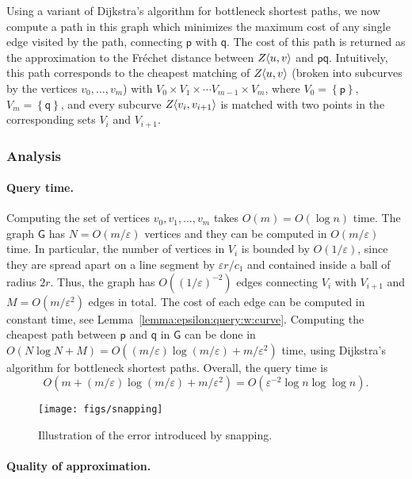 \documentclass[12pt]{article}
\newcommand{\lemref}[1]{Lemma~\ref{lemma:#1}}
\newcommand{\figlab}[1]{\label{fig:#1}}
\newcommand{\ts}{\hspace{0.6pt}}
\newcommand{\Frechet}{Fr\'{e}c{h}e{}t\xspace}\providecommand{\Arr}{\mathop{\mathrm{\EuScript{A}}}}
\newcommand{\pnt}{\mathsf{p}}
\newcommand{\pntA}{\mathsf{q}}
\newcommand{\cZ}{{Z}}
\newcommand{\Graph}{\mathsf{G}}
\providecommand{\pth}[2][\!]{#1\left({#2}\right)}
\providecommand{\brc}[1]{\left\{ {#1} \right\}}
\newcommand{\constA}{c_1}
\providecommand{\eps}{{\varepsilon}}\renewcommand{\Re}{{\rm I\!\hspace{-0.025em} R}}
\newcommand{\SC}[3]{{#1}\!\!\ts\ts \left\langle  #2, #3 \right\rangle}
\numberwithin{figure}{section}
\numberwithin{equation}{section}
\begin{document}
Using a variant of Dijkstra's algorithm for bottleneck shortest paths,
we now compute a path in this graph which minimizes the maximum cost
of any single edge visited by the path, connecting $\pnt$ with
$\pntA$. The cost of this path is returned as the approximation to the
\Frechet distance between $\SC{\cZ}{u}{v}$ and $\pnt \pntA$.
Intuitively, this path corresponds to the cheapest matching of
$\SC{\cZ}{u}{v}$ (broken into subcurves by the vertices $v_0,\ldots,
v_m$) with $V_0 \times V_1 \times \cdots V_{m-1} \times V_m$, where
$V_0 = \brc{\pnt}$, $V_m = \brc{\pntA}$, and every subcurve
$\SC{\cZ}{v_i}{v_{i+1}}$ is matched with two points in the
corresponding sets $V_i$ and $V_{i+1}$.


\subsubsection{Analysis}

\paragraph{Query time.}
Computing the set of vertices $v_0,v_1, \ldots, v_m$ takes $O( m) = O(
\log n)$ time.  The graph $\Graph$ has $N=O(m/\eps)$ vertices and they
can be computed in $O(m /\eps )$ time. In particular, the number of
vertices in $V_i$ is bounded by $O(1/\eps)$, since they are spread
apart on a line segment by $\eps r/\constA$ and contained inside a
ball of radius $2r$. Thus, the graph has $O\pth{\pth{1/\eps}^{-2}}$
edges connecting $V_i$ with $V_{i+1}$ and $M=O\pth{m/\eps^2}$ edges in
total. The cost of each edge can be computed in constant time, see
\lemref{epsilon:query:w:curve}.  Computing the cheapest path between
$\pnt$ and $\pntA$ in $\Graph$ can be done in $O(N\log N + M)=O\pth{
   (m/\eps) \log (m/\eps) + m/\eps^2}$ time, using Dijkstra's
algorithm for bottleneck shortest paths. Overall, the query time is
\[O\pth{ m + (m/\eps)\log (m/\eps) + m/\eps^2} = O\pth{ \eps^{-2} \log
   n \log\log n}.\]

\begin{figure}\centering
    \texttt{[image: figs/snapping]}
    \caption{Illustration of the error introduced by snapping. }
    \figlab{snapping-error}
\end{figure}

\paragraph{Quality of approximation.}
\end{document}
